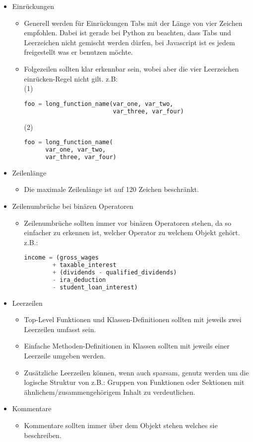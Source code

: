 \begin{itemize}
\item Einrückungen
\begin{itemize}
\item Generell werden für Einrückungen Tabs mit der Länge von vier Zeichen empfohlen. Dabei ist gerade bei Python zu beachten, dass Tabs und Leerzeichen nicht gemischt werden dürfen, bei Javascript ist es jedem freigestellt was er benutzen möchte.
\item Folgezeilen sollten klar erkennbar sein, wobei aber die \grqq vier Leerzeichen einrücken\grqq -Regel nicht gilt.
z.B: \\
(1)
\begin{lstlisting}[language=python]
foo = long_function_name(var_one, var_two,
                         var_three, var_four)
\end{lstlisting}
(2) 
\begin{lstlisting}[language=python]
foo = long_function_name(
  	  var_one, var_two,
  	  var_three, var_four)   
\end{lstlisting}
\end{itemize}
\item Zeilenlänge
\begin{itemize}
\item Die maximale Zeilenlänge ist auf 120 Zeichen beschränkt.
\end{itemize}
\item Zeilenumbrüche bei binären Operatoren
\begin{itemize}
\item Zeilenumbrüche sollten immer vor binären Operatoren stehen, da so einfacher zu erkennen ist, welcher Operator zu welchem Objekt gehört.
z.B.: 
\begin{lstlisting}[language=python]
income = (gross_wages
        + taxable_interest
        + (dividends - qualified_dividends)
        - ira_deduction
        - student_loan_interest)
\end{lstlisting}
\end{itemize}
\item Leerzeilen
\begin{itemize}
\item Top-Level Funktionen und Klassen-Definitionen sollten mit jeweils zwei Leerzeilen umfasst sein.
\item Einfache Methoden-Definitionen in Klassen sollten mit jeweils einer Leerzeile umgeben werden.
\item Zusätzliche Leerzeilen können, wenn auch sparsam, genutz werden um die logische Struktur von z.B.: Gruppen von Funktionen oder Sektionen mit ähnlichem/zusammengehörigem Inhalt zu verdeutlichen.
\end{itemize}
\item Kommentare
\begin{itemize}
\item Kommentare sollten immer über dem Objekt stehen welches sie beschreiben.
\end{itemize}
\end{itemize}

